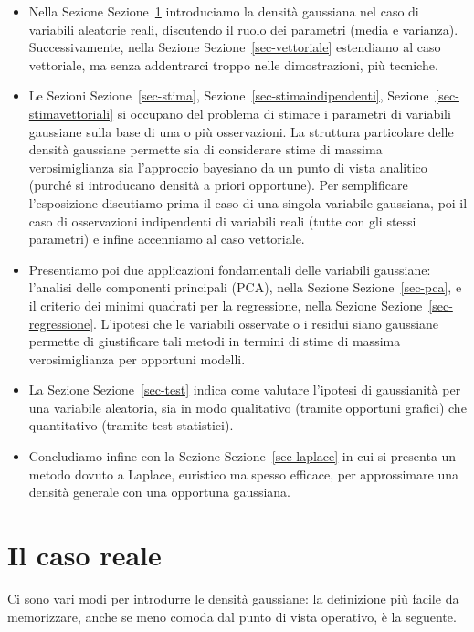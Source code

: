 \documentclass[
  italian,
  letterpaper,
]{book}
\theoremstyle{definition}
\theoremstyle{remark}
\begin{document}
\begin{itemize}
\item
  Nella Sezione Sezione~\ref{sec-reale} introduciamo la densità
  gaussiana nel caso di variabili aleatorie reali, discutendo il ruolo
  dei parametri (media e varianza). Successivamente, nella Sezione
  Sezione~\ref{sec-vettoriale} estendiamo al caso vettoriale, ma senza
  addentrarci troppo nelle dimostrazioni, più tecniche.
\item
  Le Sezioni Sezione~\ref{sec-stima},
  Sezione~\ref{sec-stimaindipendenti}, Sezione~\ref{sec-stimavettoriali}
  si occupano del problema di stimare i parametri di variabili gaussiane
  sulla base di una o più osservazioni. La struttura particolare delle
  densità gaussiane permette sia di considerare stime di massima
  verosimiglianza sia l'approccio bayesiano da un punto di vista
  analitico (purché si introducano densità a priori opportune). Per
  semplificare l'esposizione discutiamo prima il caso di una singola
  variabile gaussiana, poi il caso di osservazioni indipendenti di
  variabili reali (tutte con gli stessi parametri) e infine accenniamo
  al caso vettoriale.
\item
  Presentiamo poi due applicazioni fondamentali delle variabili
  gaussiane: l'analisi delle componenti principali (PCA), nella Sezione
  Sezione~\ref{sec-pca}, e il criterio dei minimi quadrati per la
  regressione, nella Sezione Sezione~\ref{sec-regressione}. L'ipotesi
  che le variabili osservate o i residui siano gaussiane permette di
  giustificare tali metodi in termini di stime di massima
  verosimiglianza per opportuni modelli.
\item
  La Sezione Sezione~\ref{sec-test} indica come valutare l'ipotesi di
  gaussianità per una variabile aleatoria, sia in modo qualitativo
  (tramite opportuni grafici) che quantitativo (tramite test
  statistici).
\item
  Concludiamo infine con la Sezione Sezione~\ref{sec-laplace} in cui si
  presenta un metodo dovuto a Laplace, euristico ma spesso efficace, per
  approssimare una densità generale con una opportuna gaussiana.
\end{itemize}

\section{Il caso reale}\label{sec-reale}

Ci sono vari modi per introdurre le densità gaussiane: la definizione
più facile da memorizzare, anche se meno comoda dal punto di vista
operativo, è la seguente.
\end{document}
